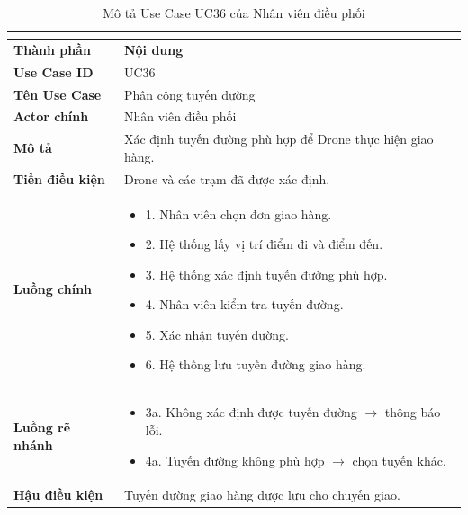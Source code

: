 \begin{longtable}{|C{3cm}|L{11cm}|}
\caption{Mô tả Use Case UC36 của Nhân viên điều phối}\\
\label{tab:mo-ta-uc36-dieu-phoi}\\
\hline
\textbf{Thành phần} & \textbf{Nội dung} \\
\hline
\textbf{Use Case ID} & UC36 \\
\hline
\textbf{Tên Use Case} & Phân công tuyến đường \\
\hline
\textbf{Actor chính} & Nhân viên điều phối \\
\hline
\textbf{Mô tả} &
Xác định tuyến đường phù hợp để Drone thực hiện giao hàng. \\
\hline
\textbf{Tiền điều kiện} &
Drone và các trạm đã được xác định. \\
\hline
\textbf{Luồng chính} &
\begin{itemize}[leftmargin=*,topsep=2pt,itemsep=2pt]
    \item 1. Nhân viên chọn đơn giao hàng.
    \item 2. Hệ thống lấy vị trí điểm đi và điểm đến.
    \item 3. Hệ thống xác định tuyến đường phù hợp.
    \item 4. Nhân viên kiểm tra tuyến đường.
    \item 5. Xác nhận tuyến đường.
    \item 6. Hệ thống lưu tuyến đường giao hàng.
\end{itemize} \\
\hline
\textbf{Luồng rẽ nhánh} &
\begin{itemize}[leftmargin=*,topsep=2pt,itemsep=2pt]
    \item 3a. Không xác định được tuyến đường $\rightarrow$ thông báo lỗi.
    \item 4a. Tuyến đường không phù hợp $\rightarrow$ chọn tuyến khác.
\end{itemize} \\
\hline
\textbf{Hậu điều kiện} &
Tuyến đường giao hàng được lưu cho chuyến giao. \\
\hline
\end{longtable}


